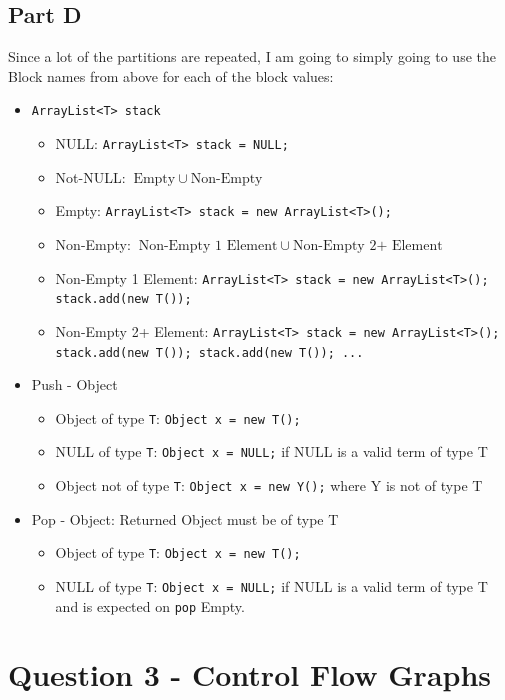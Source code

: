\documentclass{article}
\newcommand{\Stack}{\texttt{ArrayList<T> stack} }
\begin{document}
\subsection*{Part D}

Since a lot of the partitions are repeated, I am going to simply going to use the Block names from above for each of the block values:

\begin{itemize}
    \item \Stack
    \begin{itemize}
        \item NULL: \texttt{ArrayList<T> stack = NULL;}
        \item Not-NULL: $\text{Empty}\ \cup\ \text{Non-Empty}$
        \item Empty: \texttt{ArrayList<T> stack = new ArrayList<T>();}
        \item Non-Empty:  $\text{Non-Empty 1 Element}\ \cup\ \text{Non-Empty 2+ Element}$
        \item Non-Empty 1 Element: \texttt{ArrayList<T> stack = new ArrayList<T>(); stack.add(new T());}
        \item Non-Empty 2+ Element: \texttt{ArrayList<T> stack = new ArrayList<T>(); stack.add(new T()); stack.add(new T()); ...}
    \end{itemize}
    \item Push - Object
    \begin{itemize}
        \item Object of type \texttt{T}: \texttt{Object x = new T();}
        \item NULL of type \texttt{T}: \texttt{Object x = NULL;} if NULL is a valid term of type T
        \item Object not of type \texttt{T}: \texttt{Object x = new Y();} where Y is not of type T
    \end{itemize}
    \item Pop - Object: Returned Object must be of type T
    \begin{itemize}
        \item Object of type \texttt{T}: \texttt{Object x = new T();}
        \item NULL of type \texttt{T}: \texttt{Object x = NULL;} if NULL is a valid term of type T and is expected on \texttt{pop} Empty.
    \end{itemize}
\end{itemize}

\section*{Question 3 - Control Flow Graphs}
\end{document}

